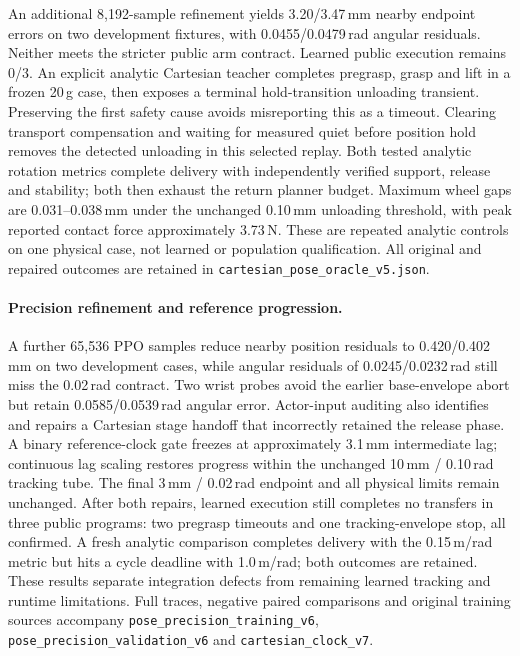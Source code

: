 An additional 8,192-sample refinement yields 3.20/3.47\,mm nearby endpoint errors
on two development fixtures, with 0.0455/0.0479\,rad angular residuals. Neither
meets the stricter public arm contract. Learned public execution remains 0/3.
An explicit analytic Cartesian teacher completes pregrasp, grasp and lift in a
frozen 20\,g case, then exposes a terminal hold-transition unloading transient.
Preserving the first safety cause avoids misreporting this as a timeout.
Clearing transport compensation and waiting for measured quiet before position
hold removes the detected unloading in this selected replay. Both tested
analytic rotation metrics complete delivery with independently verified support,
release and stability; both then exhaust the return planner budget. Maximum
wheel gaps are 0.031--0.038\,mm under the unchanged 0.10\,mm unloading threshold,
with peak reported contact force approximately 3.73\,N. These are repeated
analytic controls on one physical case, not learned or population qualification.
All original and repaired outcomes are retained in
\texttt{cartesian\_pose\_oracle\_v5.json}.


\paragraph{Precision refinement and reference progression.}
A further 65,536 PPO samples reduce nearby position residuals to
0.420/0.402\,mm on two development cases, while angular residuals of
0.0245/0.0232\,rad still miss the 0.02\,rad contract. Two wrist probes avoid
the earlier base-envelope abort but retain 0.0585/0.0539\,rad angular error.
Actor-input auditing also identifies and repairs a Cartesian stage handoff that
incorrectly retained the release phase. A binary reference-clock gate freezes
at approximately 3.1\,mm intermediate lag; continuous lag scaling restores
progress within the unchanged 10\,mm / 0.10\,rad tracking tube. The final
3\,mm / 0.02\,rad endpoint and all physical limits remain unchanged.
After both repairs, learned execution still completes no transfers in three
public programs: two pregrasp timeouts and one tracking-envelope stop, all
confirmed. A fresh analytic comparison completes delivery with the 0.15\,m/rad
metric but hits a cycle deadline with 1.0\,m/rad; both outcomes are retained.
These results separate integration defects from remaining learned tracking and
runtime limitations. Full traces, negative paired comparisons and original
training sources accompany \texttt{pose\_precision\_training\_v6},
\texttt{pose\_precision\_validation\_v6} and \texttt{cartesian\_clock\_v7}.


